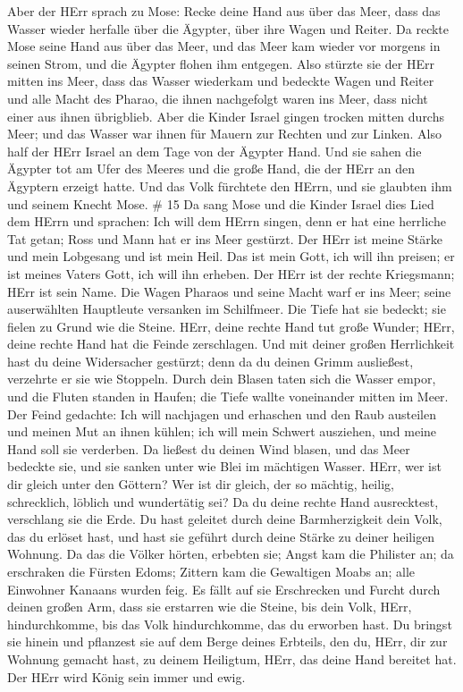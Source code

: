  Aber der HErr sprach zu Mose: Recke deine Hand aus über
das Meer, dass das Wasser wieder herfalle über die Ägypter, über ihre
Wagen und Reiter.  Da reckte Mose seine Hand aus über das
Meer, und das Meer kam wieder vor morgens in seinen Strom, und die
Ägypter flohen ihm entgegen. Also stürzte sie der HErr mitten ins Meer,
 dass das Wasser wiederkam und bedeckte Wagen und Reiter
und alle Macht des Pharao, die ihnen nachgefolgt waren ins Meer, dass
nicht einer aus ihnen übrigblieb.  Aber die Kinder Israel
gingen trocken mitten durchs Meer; und das Wasser war ihnen für Mauern
zur Rechten und zur Linken.  Also half der HErr Israel an
dem Tage von der Ägypter Hand. Und sie sahen die Ägypter tot am Ufer des
Meeres  und die große Hand, die der HErr an den Ägyptern
erzeigt hatte. Und das Volk fürchtete den HErrn, und sie glaubten ihm
und seinem Knecht Mose. \# 15  Da sang Mose und die Kinder
Israel dies Lied dem HErrn und sprachen: Ich will dem HErrn singen, denn
er hat eine herrliche Tat getan; Ross und Mann hat er ins Meer gestürzt.
 Der HErr ist meine Stärke und mein Lobgesang und ist mein
Heil. Das ist mein Gott, ich will ihn preisen; er ist meines Vaters
Gott, ich will ihn erheben.  Der HErr ist der rechte
Kriegsmann; HErr ist sein Name.  Die Wagen Pharaos und seine
Macht warf er ins Meer; seine auserwählten Hauptleute versanken im
Schilfmeer.  Die Tiefe hat sie bedeckt; sie fielen zu Grund
wie die Steine.  HErr, deine rechte Hand tut große Wunder;
HErr, deine rechte Hand hat die Feinde zerschlagen.  Und mit
deiner großen Herrlichkeit hast du deine Widersacher gestürzt; denn da
du deinen Grimm ausließest, verzehrte er sie wie Stoppeln. 
Durch dein Blasen taten sich die Wasser empor, und die Fluten standen in
Haufen; die Tiefe wallte voneinander mitten im Meer.  Der
Feind gedachte: Ich will nachjagen und erhaschen und den Raub austeilen
und meinen Mut an ihnen kühlen; ich will mein Schwert ausziehen, und
meine Hand soll sie verderben.  Da ließest du deinen Wind
blasen, und das Meer bedeckte sie, und sie sanken unter wie Blei im
mächtigen Wasser.  HErr, wer ist dir gleich unter den
Göttern? Wer ist dir gleich, der so mächtig, heilig, schrecklich,
löblich und wundertätig sei?  Da du deine rechte Hand
ausrecktest, verschlang sie die Erde.  Du hast geleitet
durch deine Barmherzigkeit dein Volk, das du erlöset hast, und hast sie
geführt durch deine Stärke zu deiner heiligen Wohnung.  Da
das die Völker hörten, erbebten sie; Angst kam die Philister an;
 da erschraken die Fürsten Edoms; Zittern kam die
Gewaltigen Moabs an; alle Einwohner Kanaans wurden feig. 
Es fällt auf sie Erschrecken und Furcht durch deinen großen Arm, dass
sie erstarren wie die Steine, bis dein Volk, HErr, hindurchkomme, bis
das Volk hindurchkomme, das du erworben hast.  Du bringst
sie hinein und pflanzest sie auf dem Berge deines Erbteils, den du,
HErr, dir zur Wohnung gemacht hast, zu deinem Heiligtum, HErr, das deine
Hand bereitet hat.  Der HErr wird König sein immer und
ewig.

